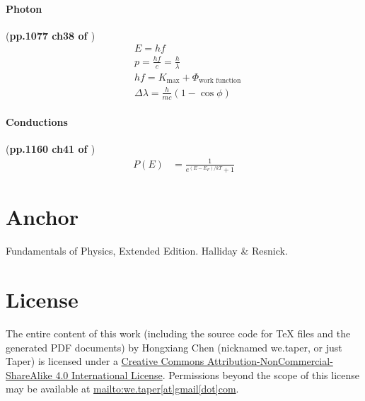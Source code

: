 \documentclass{article}
\numberwithin{equation}{subsection} %
\theoremstyle{definition}
\begin{document}
\paragraph{Photon} (\textbf{pp.1077 ch38 of \cite{book}})
\begin{align}
    & E = h f \\
    & p= \frac{hf}{c} = \frac{h}{\lambda} \\
    & hf = K_\text{max} + \Phi_\text{work function} \\
    & \Delta\lambda = \frac{h}{mc}(1-\cos{\phi})
\end{align}

\paragraph{Conductions} (\textbf{pp.1160 ch41 of \cite{book}})
\begin{align}
    P(E) &= \frac{1}{e^{(E-E_F)/kT} +1} 
\end{align}


\section{Anchor}
\label{sec:anchor}
\begin{thebibliography}{1}
     Fundamentals of Physics, Extended Edition. Halliday
    \& Resnick.
\end{thebibliography}
\printnomenclature
\section{License}
The entire content of this work (including the source code
for TeX files and the generated PDF documents) by 
Hongxiang Chen (nicknamed we.taper, or just Taper) is
licensed under a 
\href{http://creativecommons.org/licenses/by-nc-sa/4.0/}{Creative 
Commons Attribution-NonCommercial-ShareAlike 4.0 International 
License}. Permissions beyond the scope of this 
license may be available at \url{mailto:we.taper[at]gmail[dot]com}.
\end{document}
